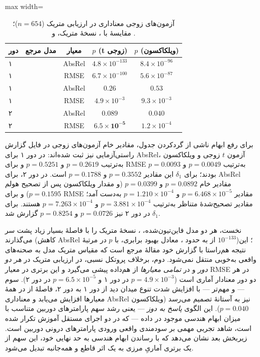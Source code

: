 \begin{table}[htbp]
\centering
\caption{آزمون‌های زوجی معناداری در ارزیابی متریک ($n=654$)؛ مقایسهٔ \proposedmodel{} با \publishedbasemodel{}، نسخهٔ متریک، و \controlmodel{}.}
\label{tab:nyu_metric_significance}
\small
\begin{adjustbox}{max width=\textwidth}
\begin{tabular}{llccc}
\hline
دور & مدل مرجع & معیار & $p$ (t زوجی) & $p$ (ویلکاکسون) \\ \hline
۱ & \tablepublishedmodel{} & AbsRel & $4.8\times10^{-133}$ & $8.4\times10^{-96}$ \\
۱ & \tablepublishedmodel{} & RMSE & $6.7\times10^{-100}$ & $5.6\times10^{-87}$ \\
۱ & \tablecontrolmodel{} & AbsRel & $0.26$ & $0.53$ \\
۱ & \tablecontrolmodel{} & RMSE & $4.9\times10^{-3}$ & $9.3\times10^{-3}$ \\ \hline
۲ & \tablecontrolmodel{} & AbsRel & $0.089$ & $\mathbf{0.040}$ \\
۲ & \tablecontrolmodel{} & RMSE & $\mathbf{6.5\times10^{-5}}$ & $1.2\times10^{-4}$ \\ \hline
\end{tabular}
\end{adjustbox}
\end{table}

برای رفع ابهام ناشی از گردکردن جدول، مقادیر خام آزمون‌های زوجی در فایل گزارش
راستی‌آزمایی نیز ثبت شده‌اند: در دور ۱ برای AbsRel، آزمون $t$ زوجی و ویلکاکسون
به‌ترتیب $p=0.2619$ و $p=0.5251$ و برای RMSE به‌ترتیب $p=0.0049$ و
$p=0.0093$ بودند؛ برای $\delta_1$ این مقادیر $p=0.3552$ و $p=0.1788$ است.
در دور ۲، برای AbsRel مقادیر خام $p=0.0892$ و $p=0.0399$ (و مقدار ویلکاکسون
پس از تصحیح هولم $p=0.1595$) و برای RMSE مقادیر $p=6.468\times10^{-5}$ و
$p=1.210\times10^{-4}$ به‌دست آمد؛ مقادیر تصحیح‌شدهٔ متناظر به‌ترتیب
$p=3.881\times10^{-4}$ و $p=7.263\times10^{-4}$ هستند. برای $\delta_1$ در
دور ۲ نیز $p=0.0726$ و $p=0.8254$ گزارش شد.

نخست، هر دو مدل فاین‌تیون‌شده، \publishedbasemodel{}، نسخهٔ متریک را با فاصلهٔ بسیار زیاد پشت سر می‌گذارند (کاهش AbsRel از  به حدود ، معادل بهبود  برابری، با $p$ در مرتبهٔ $10^{-133}$)؛ این نتیجه هم‌راستا با گزارش خود مقالهٔ مرجع است که مقیاس متریک مدل  به صحنه‌های واقعی به‌خوبی منتقل نمی‌شود. دوم، برخلاف پروتکل نسبی، در ارزیابی متریک \proposedmodel{} در \emph{هر دو دور} و در \emph{تمامی معیارها} از \controlmodel{} هم‌داده پیشی می‌گیرد و این برتری در معیار RMSE در هر دو دور معنادار آماری است ($p=4.9\times10^{-3}$ در دور ۱ و $p=6.5\times10^{-5}$ در دور ۲). سوم --- و مهم‌تر --- با افزایش شدت تنوع میدان دید از دور ۱ به دور ۲، فاصلهٔ \proposedmodel{} از \controlmodel{} در همهٔ معیارها افزایش می‌یابد و معناداری AbsRel نیز به آستانهٔ تصمیم می‌رسد (ویلکاکسون $p=0.040$). این الگوی \emph{پاسخ به دوز} --- یعنی رشد سهم پارامترهای دوربین متناسب با میزان ابهام هندسی موجود در داده --- که در دو اجرای مستقل آموزش تکرار شده است، شاهد تجربی مهمی بر سودمندی واقعی ورودی پارامترهای درونی دوربین است. زیربخش بعد نشان می‌دهد که با رساندن ابهام هندسی به حد نهایی خود، این سهم از یک برتری آماریِ مرزی به یک اثر قاطع و همه‌جانبه تبدیل می‌شود.

